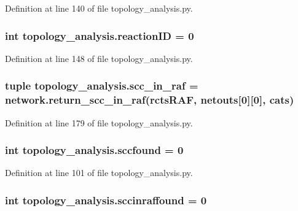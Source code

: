 Definition at line 140 of file topology\-\_\-analysis.\-py.

\hypertarget{a00128_a07d632b487fabd051ab725ee95a85368}{
\subsubsection[{reaction\-I\-D}]{\setlength{\rightskip}{0pt plus 5cm}int topology\-\_\-analysis.\-reaction\-I\-D = 0}}\label{a00128_a07d632b487fabd051ab725ee95a85368}


Definition at line 148 of file topology\-\_\-analysis.\-py.

\hypertarget{a00128_ac864e2a75b705766c1d81f68897f52c0}{
\subsubsection[{scc\-\_\-in\-\_\-raf}]{\setlength{\rightskip}{0pt plus 5cm}tuple topology\-\_\-analysis.\-scc\-\_\-in\-\_\-raf = network.\-return\-\_\-scc\-\_\-in\-\_\-raf({\bf rcts\-R\-A\-F}, {\bf netouts}\mbox{[}0\mbox{]}\mbox{[}0\mbox{]}, cats)}}\label{a00128_ac864e2a75b705766c1d81f68897f52c0}


Definition at line 179 of file topology\-\_\-analysis.\-py.

\hypertarget{a00128_aa8258ef828502be89350332ae97a0d3a}{
\subsubsection[{sccfound}]{\setlength{\rightskip}{0pt plus 5cm}int topology\-\_\-analysis.\-sccfound = 0}}\label{a00128_aa8258ef828502be89350332ae97a0d3a}


Definition at line 101 of file topology\-\_\-analysis.\-py.

\hypertarget{a00128_a3dd0e59d1fb4786b4bec44f325585eb6}{
\subsubsection[{sccinraffound}]{\setlength{\rightskip}{0pt plus 5cm}int topology\-\_\-analysis.\-sccinraffound = 0}}\label{a00128_a3dd0e59d1fb4786b4bec44f325585eb6}


